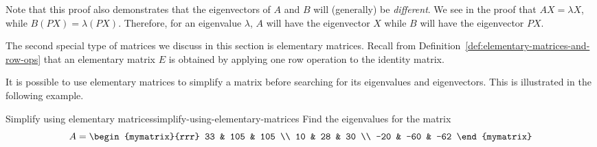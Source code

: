 Note that this proof also demonstrates that the eigenvectors of $A$
and $B$ will (generally) be {\em different}.  We see in the proof that
$AX = \lambda X$, while $B (PX)=\lambda (PX)$. Therefore, for an
eigenvalue $\lambda$, $A$ will have the eigenvector $X$ while $B$ will
have the eigenvector $PX$.


The second special type of matrices we discuss in this section is
elementary matrices.  Recall from
Definition~\ref{def:elementary-matrices-and-row-ops} that an
elementary matrix $E$ is obtained by applying one row operation to the
identity matrix.

It is possible to use elementary matrices to simplify a matrix before
searching for its eigenvalues and eigenvectors. This is illustrated in
the following example.

\begin{example}{Simplify using elementary matrices}{simplify-using-elementary-matrices}
  Find the eigenvalues for the matrix
  \begin{equation*}
    A = \begin{mymatrix}{rrr}
      33 & 105 & 105 \\
      10 &  28 & 30 \\
      -20 & -60 & -62
    \end{mymatrix}
  \end{equation*}
\end{example}

